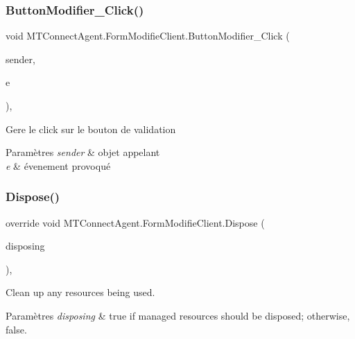 \subsubsection{\texorpdfstring{Button\+Modifier\+\_\+\+Click()}{ButtonModifier\_Click()}}
{\footnotesize\ttfamily void M\+T\+Connect\+Agent.\+Form\+Modifie\+Client.\+Button\+Modifier\+\_\+\+Click (\begin{DoxyParamCaption}\item[{object}]{sender,  }\item[{Event\+Args}]{e }\end{DoxyParamCaption})\hspace{0.3cm}{\ttfamily [inline]}, {\ttfamily [private]}}



Gere le click sur le bouton de validation 


\begin{DoxyParams}{Paramètres}
{\em sender} & objet appelant\\
\hline
{\em e} & évenement provoqué\\
\hline
\end{DoxyParams}
\mbox{\label{class_m_t_connect_agent_1_1_form_modifie_client_aa6bee7fe870c277672868b2672841149}} 
\subsubsection{\texorpdfstring{Dispose()}{Dispose()}}
{\footnotesize\ttfamily override void M\+T\+Connect\+Agent.\+Form\+Modifie\+Client.\+Dispose (\begin{DoxyParamCaption}\item[{bool}]{disposing }\end{DoxyParamCaption})\hspace{0.3cm}{\ttfamily [inline]}, {\ttfamily [protected]}}



Clean up any resources being used. 


\begin{DoxyParams}{Paramètres}
{\em disposing} & true if managed resources should be disposed; otherwise, false.\\
\hline
\end{DoxyParams}
\mbox{\label{class_m_t_connect_agent_1_1_form_modifie_client_abf0bb8649ca1a2917984ee61f9c590e5}} 
